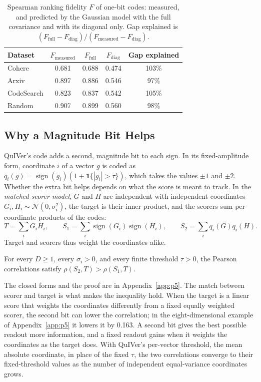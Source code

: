 \documentclass[twoside,11pt]{article}
\newcommand{\sign}{\operatorname{sign}}
\begin{document}
\begin{table}[tbp]
\centering


\begin{tabular}{lcccc}
\toprule
Dataset & $F_{\mathrm{measured}}$ & $F_{\mathrm{full}}$ & $F_{\mathrm{diag}}$ & Gap explained \\
\midrule
Cohere & 0.681 & 0.688 & 0.474 & 103\% \\
Arxiv & 0.897 & 0.886 & 0.546 & 97\% \\
CodeSearch & 0.823 & 0.837 & 0.542 & 105\% \\
Random & 0.907 & 0.899 & 0.560 & 98\% \\
\bottomrule
\end{tabular}

\small
\caption{Spearman ranking fidelity $F$ of one-bit codes: measured, and predicted by the Gaussian model with the full covariance and with its diagonal only. Gap explained is $(F_{\mathrm{full}}-F_{\mathrm{diag}})/(F_{\mathrm{measured}}-F_{\mathrm{diag}})$.}
\label{tab:fidelity}
\end{table}

\subsection{Why a Magnitude Bit Helps}
\label{sec:magnitude}

QuIVer's code adds a second, magnitude bit to each sign. In its fixed-amplitude form, coordinate $i$ of a vector $g$ is coded as $q_i(g)=\sign(g_i)(1+\mathbf 1\{|g_i|>\tau\})$, which takes the values $\pm1$ and $\pm2$. Whether the extra bit helps depends on what the score is meant to track. In the \emph{matched-scorer model}, $G$ and $H$ are independent with independent coordinates $G_i,H_i\sim\mathcal N(0,\sigma_i^2)$, the target is their inner product, and the scorers sum per-coordinate products of the codes:
\begin{equation}
T=\sum_iG_iH_i,\qquad S_1=\sum_i\sign(G_i)\sign(H_i),\qquad S_2=\sum_iq_i(G)q_i(H).
\end{equation}
Target and scorers thus weight the coordinates alike.

\begin{proposition}
\label{prop:magnitude}
For every $D\ge1$, every $\sigma_i>0$, and every finite threshold $\tau>0$, the Pearson correlations satisfy $\rho(S_2,T)>\rho(S_1,T)$.
\end{proposition}

The closed forms and the proof are in Appendix~\ref{app:p5}. The match between scorer and target is what makes the inequality hold. When the target is a linear score that weights the coordinates differently from a fixed equally weighted scorer, the second bit can lower the correlation; in the eight-dimensional example of Appendix~\ref{app:p5} it lowers it by 0.163. A second bit gives the best possible readout more information, and a fixed readout gains when it weights the coordinates as the target does. With QuIVer's per-vector threshold, the mean absolute coordinate, in place of the fixed $\tau$, the two correlations converge to their fixed-threshold values as the number of independent equal-variance coordinates grows.
\end{document}
